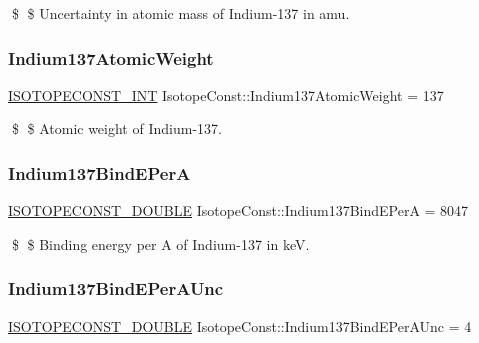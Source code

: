 \$ \$ Uncertainty in atomic mass of Indium-\/137 in amu. \mbox{\label{group___isotope_const-_indium-_in137_ga633ab68d3e5de90ca802e55ea32645ec}} 
\subsubsection{\texorpdfstring{Indium137\+Atomic\+Weight}{Indium137AtomicWeight}}
{\footnotesize\ttfamily \mbox{\hyperlink{group___isotope_const-_macros_ga5f18360b3e99483a35c32d789e62621c}{I\+S\+O\+T\+O\+P\+E\+C\+O\+N\+S\+T\+\_\+\+I\+NT}} Isotope\+Const\+::\+Indium137\+Atomic\+Weight = 137}

\$ \$ Atomic weight of Indium-\/137. \mbox{\label{group___isotope_const-_indium-_in137_ga8d429096c17abe67a17ada72e722c94b}} 
\subsubsection{\texorpdfstring{Indium137\+Bind\+E\+PerA}{Indium137BindEPerA}}
{\footnotesize\ttfamily \mbox{\hyperlink{group___isotope_const-_macros_ga8f45a7272ce02c0b4c65c44636ed719a}{I\+S\+O\+T\+O\+P\+E\+C\+O\+N\+S\+T\+\_\+\+D\+O\+U\+B\+LE}} Isotope\+Const\+::\+Indium137\+Bind\+E\+PerA = 8047}

\$ \$ Binding energy per A of Indium-\/137 in keV. \mbox{\label{group___isotope_const-_indium-_in137_gabbf55cddbb6118d93ec0d48e20500db8}} 
\subsubsection{\texorpdfstring{Indium137\+Bind\+E\+Per\+A\+Unc}{Indium137BindEPerAUnc}}
{\footnotesize\ttfamily \mbox{\hyperlink{group___isotope_const-_macros_ga8f45a7272ce02c0b4c65c44636ed719a}{I\+S\+O\+T\+O\+P\+E\+C\+O\+N\+S\+T\+\_\+\+D\+O\+U\+B\+LE}} Isotope\+Const\+::\+Indium137\+Bind\+E\+Per\+A\+Unc = 4}

